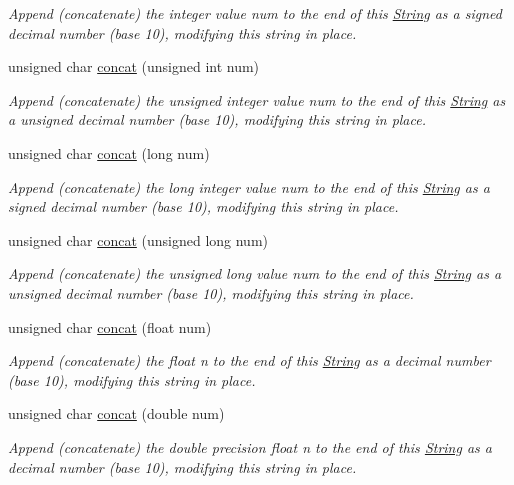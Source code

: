 \begin{DoxyCompactItemize}
\begin{DoxyCompactList}\small\item\em Append (concatenate) the integer value num to the end of this \hyperlink{class_string}{String} as a signed decimal number (base 10), modifying this string in place. \end{DoxyCompactList}\item 
unsigned char \hyperlink{class_string_af9c20f944d8a4687808017388047d155}{concat} (unsigned int num)
\begin{DoxyCompactList}\small\item\em Append (concatenate) the unsigned integer value num to the end of this \hyperlink{class_string}{String} as a unsigned decimal number (base 10), modifying this string in place. \end{DoxyCompactList}\item 
unsigned char \hyperlink{class_string_a92a456f8679a19d2221ec43841238ead}{concat} (long num)
\begin{DoxyCompactList}\small\item\em Append (concatenate) the long integer value num to the end of this \hyperlink{class_string}{String} as a signed decimal number (base 10), modifying this string in place. \end{DoxyCompactList}\item 
unsigned char \hyperlink{class_string_ad502777b7549182fe9b1a14879acf307}{concat} (unsigned long num)
\begin{DoxyCompactList}\small\item\em Append (concatenate) the unsigned long value num to the end of this \hyperlink{class_string}{String} as a unsigned decimal number (base 10), modifying this string in place. \end{DoxyCompactList}\item 
unsigned char \hyperlink{class_string_af6029b556adb9a23d82d1f276ce4f8ee}{concat} (float num)
\begin{DoxyCompactList}\small\item\em Append (concatenate) the float n to the end of this \hyperlink{class_string}{String} as a decimal number (base 10), modifying this string in place. \end{DoxyCompactList}\item 
unsigned char \hyperlink{class_string_ab1e52143c6057122a71db07ed1c7fb0e}{concat} (double num)
\begin{DoxyCompactList}\small\item\em Append (concatenate) the double precision float n to the end of this \hyperlink{class_string}{String} as a decimal number (base 10), modifying this string in place. \end{DoxyCompactList}\item 

\end{DoxyCompactItemize}
